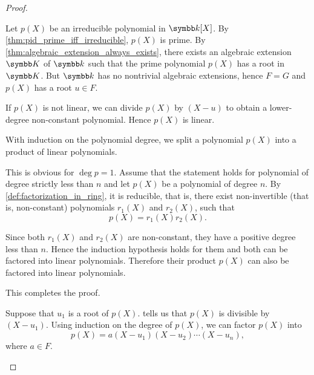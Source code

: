 \begin{proof}
  \begin{description}
     Let \( p(X) \) be an irreducible polynomial in \( \k[X] \). By \cref{thm:pid_prime_iff_irreducible}, \( p(X) \) is prime. By \cref{thm:algebraic_extension_always_exists}, there exists an algebraic extension \( \K \) of \( \k \) such that the prime polynomial \( p(X) \) has a root in \( \K \). But \( \k \) has no nontrivial algebraic extensions, hence \( F = G \) and \( p(X) \) has a root \( u \in F \).

    If \( p(X) \) is not linear\LEM, we can divide \( p(X) \) by \( (X - u) \) to obtain a lower-degree non-constant polynomial. Hence \( p(X) \) is linear.

     With induction on the polynomial degree, we split a polynomial \( p(X) \) into a product of linear polynomials.

    This is obvious for \( \deg p = 1 \). Assume that the statement holds for polynomial of degree strictly less than \( n \) and let \( p(X) \) be a polynomial of degree \( n \). By \cref{def:factorization_in_ring}, it is reducible, that is, there exist non-invertible (that is, non-constant) polynomials \( r_1(X) \) and \( r_2(X) \), such that
    \begin{equation*}
      p(X) = r_1(X) r_2(X).
    \end{equation*}

    Since both \( r_1(X) \) and \( r_2(X) \) are non-constant, they have a positive degree less than \( n \). Hence the induction hypothesis holds for them and both can be factored into linear polynomials. Therefore their product \( p(X) \) can also be factored into linear polynomials.

    This completes the proof.

     Suppose that \( u_1 \) is a root of \( p(X) \).  tells us that \( p(X) \) is divisible by \( (X - u_1) \). Using induction on the degree of \( p(X) \), we can factor \( p(X) \) into
    \begin{equation*}
      p(X) = a (X - u_1) (X - u_2) \cdots (X - u_n),
    \end{equation*}
    where \( a \in F \).


\end{description}
\end{proof}
